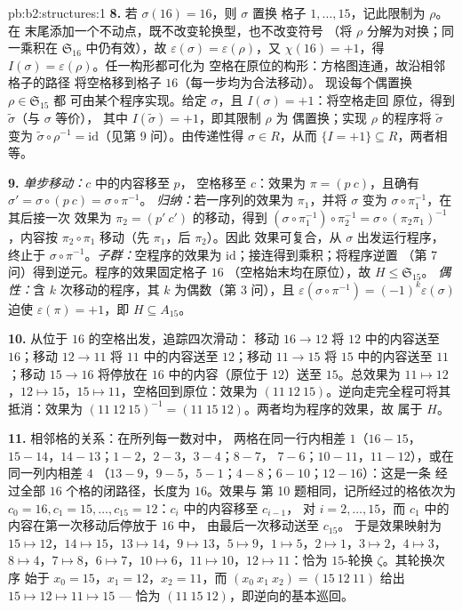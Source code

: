 \begin{solution}{pb:b2:structures:1}
\textbf{8.} 若 $\sigma(16) = 16$，则 $\sigma$ 置换
格子 $1, \dots, 15$，记此限制为 $\rho$。在
末尾添加一个不动点，既不改变轮换型，也不改变符号
（将 $\rho$ 分解为对换；同一乘积在
$\mathfrak{S}_{16}$ 中仍有效），故 $\varepsilon(\sigma) =
\varepsilon(\rho)$，又 $\chi(16) = +1$，得 $I(\sigma) =
\varepsilon(\rho)$。任一构形都可化为
空格在原位的构形：方格图连通，故沿相邻格子的路径
将空格移到格子 $16$（每一步均为合法移动）。
现设每个偶置换 $\rho \in \mathfrak{S}_{15}$ 都
可由某个程序实现。给定 $\sigma$，且 $I(\sigma) = +1$：将空格走回
原位，得到 $\widetilde\sigma$（与 $\sigma$ 等价），
其中 $I(\widetilde\sigma) = +1$，即其限制 $\rho$ 为
偶置换；实现 $\rho$ 的程序将 $\widetilde\sigma$ 变为
$\widetilde\sigma \circ \rho^{-1} = \mathrm{id}$（见第
9 问）。由传递性得 $\sigma \in R$，从而 $\{I = +1\} \subseteq
R$，两者相等。

\textbf{9.} \emph{单步移动：}$c$ 中的内容移至 $p$，
空格移至 $c$：效果为 $\pi = (p\ c)$，且确有
$\sigma' = \sigma \circ (p\ c) = \sigma \circ \pi^{-1}$。
\emph{归纳：}若一序列的效果为 $\pi_1$，并将
$\sigma$ 变为 $\sigma \circ \pi_1^{-1}$，在其后接一次
效果为 $\pi_2 = (p'\ c')$ 的移动，得到 $(\sigma \circ \pi_1^{-1})
\circ \pi_2^{-1} = \sigma \circ (\pi_2\pi_1)^{-1}$，内容按
$\pi_2 \circ \pi_1$ 移动（先 $\pi_1$，后 $\pi_2$）。因此
效果可复合，从 $\sigma$ 出发运行程序，终止于 $\sigma
\circ \pi^{-1}$。\emph{子群：}空程序的效果为
$\mathrm{id}$；接连得到乘积；将程序逆置
（第 7 问）得到逆元。程序的效果固定格子 $16$
（空格始末均在原位），故 $H \leq \mathfrak{S}_{15}$。
\emph{偶性：}含 $k$ 次移动的程序，其 $k$ 为偶数（第
3 问），且 $\varepsilon(\sigma \circ \pi^{-1}) =
(-1)^k\varepsilon(\sigma)$ 迫使 $\varepsilon(\pi) = +1$，即 $H
\subseteq A_{15}$。

\textbf{10.} 从位于 $16$ 的空格出发，追踪四次滑动：
移动 $16 \to 12$ 将 $12$ 中的内容送至 $16$；移动 $12 \to 11$
将 $11$ 中的内容送至 $12$；移动 $11 \to 15$ 将
$15$ 中的内容送至 $11$；移动 $15 \to 16$ 将停放在
$16$ 中的内容（原位于 $12$）送至 $15$。总效果为 $11 \mapsto
12$，$12 \mapsto 15$，$15 \mapsto 11$，空格回到原位：效果为
$(11\ 12\ 15)$。逆向走完全程可将其抵消：效果为 $(11\ 12\
15)^{-1} = (11\ 15\ 12)$。两者均为程序的效果，故
属于 $H$。

\textbf{11.} 相邻格的关系：在所列每一数对中，
两格在同一行内相差 $1$（$16{-}15$，
$15{-}14$，$14{-}13$；$1{-}2$，$2{-}3$，$3{-}4$；$8{-}7$，
$7{-}6$；$10{-}11$，$11{-}12$），或在同一列内相差 $4$
（$13{-}9$，$9{-}5$，$5{-}1$；$4{-}8$；$6{-}10$；$12{-}16$）：这是一条
经过全部 $16$ 个格的闭路径，长度为 $16$。效果与
第 10 题相同，记所经过的格依次为 $c_0 = 16, c_1 = 15,
\dots, c_{15} = 12$：$c_i$ 中的内容移至 $c_{i-1}$，
对 $i = 2, \dots, 15$，而 $c_1$ 中的内容在第一次移动后停放于 $16$ 中，
由最后一次移动送至 $c_{15}$。
于是效果映射为 $15 \mapsto 12$，$14 \mapsto 15$，$13
\mapsto 14$，$9 \mapsto 13$，$5 \mapsto 9$，$1 \mapsto 5$，$2
\mapsto 1$，$3 \mapsto 2$，$4 \mapsto 3$，$8 \mapsto 4$，$7
\mapsto 8$，$6 \mapsto 7$，$10 \mapsto 6$，$11 \mapsto 10$，$12
\mapsto 11$：恰为 $15$-轮换 $\zeta$。其轮换次序
始于 $x_0 = 15$，$x_1 = 12$，$x_2 = 11$，而 $(x_0\ x_1\ x_2)
= (15\ 12\ 11)$ 给出 $15 \mapsto 12 \mapsto 11 \mapsto 15$ ---
恰为 $(11\ 15\ 12)$，即逆向的基本巡回。


\end{solution}
